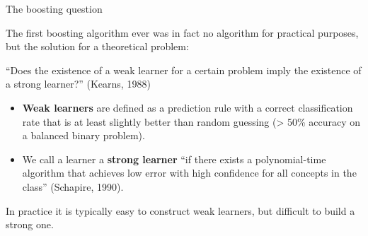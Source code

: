 \begin{vbframe}{The boosting question}

The first boosting algorithm ever was in fact no algorithm for practical purposes, but the solution for a theoretical problem:

\lz

\enquote{Does the existence of a weak learner for a certain problem imply
the existence of a strong learner?} (Kearns, 1988)

\lz

\begin{itemize}
\item \textbf{Weak learners} are defined as a prediction rule with a correct classification rate that is at least slightly better than random guessing (> 50\% accuracy on a balanced binary problem).
\item We call a learner a \textbf{strong learner} \enquote{if there exists a polynomial-time algorithm that achieves low error with high confidence for all concepts in the class} (Schapire, 1990).

\end{itemize}

In practice it is typically easy to construct weak learners, but difficult to build a strong one.

\end{vbframe}




